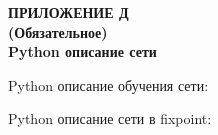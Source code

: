 \clearpage
{}%
\par

\normalsize
\begin{center}
  \textbf{ПРИЛОЖЕНИЕ Д} \\
  \textbf{(Обязательное)} \\
  \textbf{Python описание сети}
\end{center}

Python описание обучения сети:



Python описание сети в fixpoint:



\pdfpagewidth=210mm
\pdfpageheight=297mm